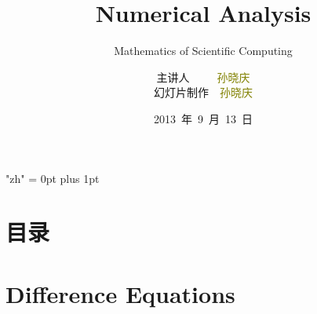 \documentclass[notheorems,mathserif,table,compress]{beamer}  %
\begin{document}
\XeTeXlinebreaklocale "zh"         %
\XeTeXlinebreakskip = 0pt plus 1pt %
\title[Numerical Analysis]{Numerical Analysis}
\subtitle{Mathematics of Scientific Computing}
\author[sun]{主讲人~~~~~\textcolor{olive}{孙晓庆}\\
    \quad 幻灯片制作~~\textcolor{olive}{孙晓庆}}
\institute[中国海洋大学]{\small\textcolor{violet}{中国海洋大学~~信息科学与工程学院}}
\date{2013~年~9~月~13~日}
\frame{ \titlepage }
\section*{目录}
\section{Difference Equations}
\end{document}
